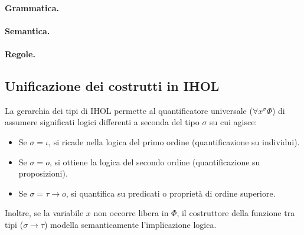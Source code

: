 \paragraph{Grammatica.}


\paragraph{Semantica.}


\paragraph{Regole.} \breakpara


\subsection{Unificazione dei costrutti in IHOL}
La gerarchia dei tipi di IHOL permette al quantificatore universale ($\forall x^\sigma \Phi$) di assumere significati logici differenti a seconda del tipo $\sigma$ su cui agisce:
\begin{itemize}[leftmargin=1.5em]
    \item Se $\sigma = \iota$, si ricade nella logica del primo ordine (quantificazione su individui).
    \item Se $\sigma = o$, si ottiene la logica del secondo ordine (quantificazione su proposizioni).
    \item Se $\sigma = \tau \to o$, si quantifica su predicati o proprietà di ordine superiore.
\end{itemize}
Inoltre, se la variabile $x$ non occorre libera in $\Phi$, il costruttore della funzione tra tipi ($\sigma \to \tau$) modella semanticamente l'implicazione logica.
